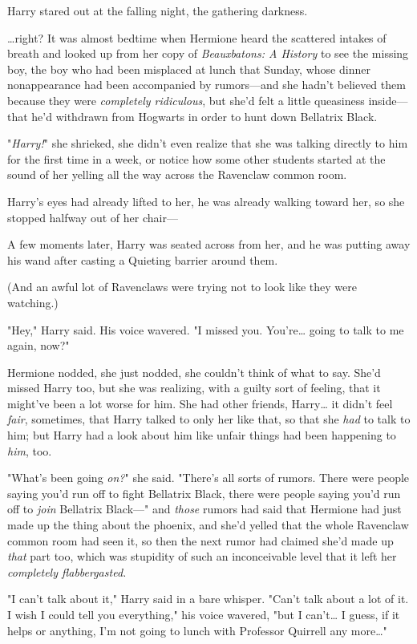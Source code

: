 Harry stared out at the falling night, the gathering darkness.

{\ldots}right?
\sbreak
It was almost bedtime when Hermione heard the scattered intakes of breath and 
looked up from her copy of \emph{Beauxbatons: A History} to see the missing 
boy, the boy who had been misplaced at lunch that Sunday, whose dinner 
nonappearance had been accompanied by rumors---and she hadn't believed them 
because they were \emph{completely ridiculous}, but she'd felt a little 
queasiness inside---that he'd withdrawn from Hogwarts in order to hunt down 
Bellatrix Black.

"\emph{Harry!}" she shrieked, she didn't even realize that she was talking 
directly to him for the first time in a week, or notice how some other students 
started at the sound of her yelling all the way across the Ravenclaw common 
room.

Harry's eyes had already lifted to her, he was already walking toward her, so 
she stopped halfway out of her chair---

A few moments later, Harry was seated across from her, and he was putting away 
his wand after casting a Quieting barrier around them.

(And an awful lot of Ravenclaws were trying not to look like they were 
watching.)

"Hey," Harry said. His voice wavered. "I missed you. You're{\ldots} going to 
talk to me again, now?"

Hermione nodded, she just nodded, she couldn't think of what to say. She'd 
missed Harry too, but she was realizing, with a guilty sort of feeling, that it 
might've been a lot worse for him. She had other friends, Harry{\ldots} it 
didn't feel \emph{fair}, sometimes, that Harry talked to only her like that, so 
that she \emph{had} to talk to him; but Harry had a look about him like unfair 
things had been happening to \emph{him}, too.

"What's been going \emph{on?}" she said. "There's all sorts of rumors. There 
were people saying you'd run off to fight Bellatrix Black, there were people 
saying you'd run off to \emph{join} Bellatrix Black---" and \emph{those} rumors 
had said that Hermione had just made up the thing about the phoenix, and she'd 
yelled that the whole Ravenclaw common room had seen it, so then the next rumor 
had claimed she'd made up \emph{that} part too, which was stupidity of such an 
inconceivable level that it left her \emph{completely flabbergasted.}

"I can't talk about it," Harry said in a bare whisper. "Can't talk about a lot 
of it. I wish I could tell you everything," his voice wavered, "but I 
can't{\ldots} I guess, if it helps or anything, I'm not going to lunch with 
Professor Quirrell any more{\ldots}"

